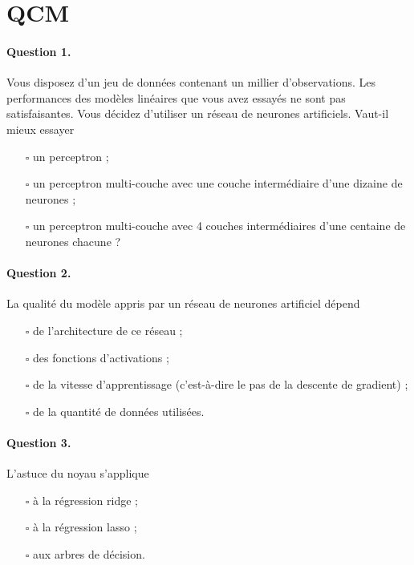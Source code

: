 \section{QCM}
\paragraph{Question 1.} Vous disposez d'un jeu de données contenant un millier
d'observations. Les performances des modèles linéaires que vous avez essayés ne
sont pas satisfaisantes. Vous décidez d'utiliser un réseau de neurones
artificiels. Vaut-il mieux essayer
\begin{itemize}
\item[$\square$] un perceptron ;
\item[$\square$] un perceptron multi-couche avec une couche intermédiaire d'une dizaine de neurones ;
\item[$\square$] un perceptron multi-couche avec 4 couches intermédiaires d'une centaine de neurones chacune ?
\end{itemize}

\paragraph{Question 2.} La qualité du modèle appris par un réseau de neurones artificiel dépend
\begin{itemize}
\item[$\square$] de l'architecture de ce réseau ;
\item[$\square$] des fonctions d'activations ;
\item[$\square$] de la vitesse d'apprentissage (c'est-à-dire le pas de la descente de gradient) ;
\item[$\square$] de la quantité de données utilisées. 
\end{itemize}

\paragraph{Question 3.} L'astuce du noyau s'applique
\begin{itemize}
\item[$\square$] à la régression ridge ;
\item[$\square$] à la régression lasso ;
\item[$\square$] aux arbres de décision.
\end{itemize}

